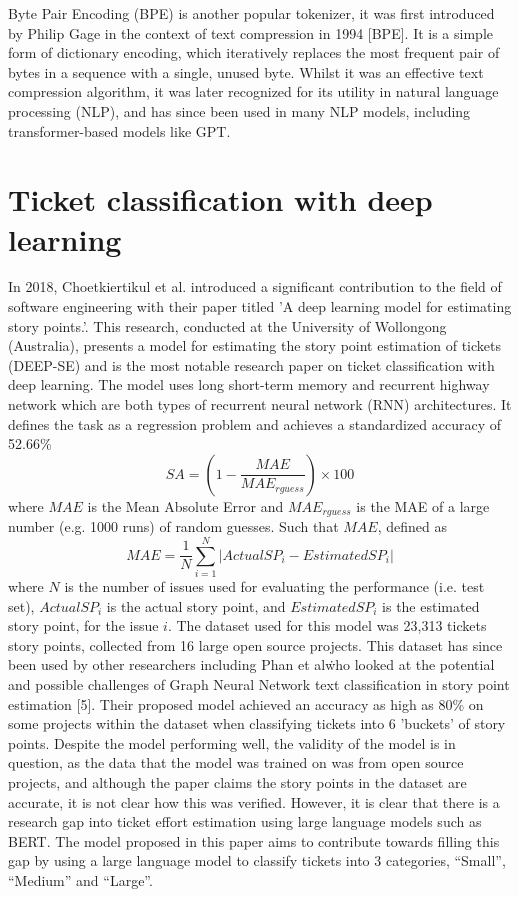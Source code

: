 \documentclass{UoYCSproject}
\begin{document}
    Byte Pair Encoding (BPE) is another popular tokenizer, it was first introduced by Philip Gage in the context of text compression in 1994 [BPE].
    It is a simple form of dictionary encoding, which iteratively replaces the most frequent pair of bytes in a sequence with a single, unused byte.
    Whilst it was an effective text compression algorithm, it was later recognized for its utility in natural language processing (NLP),
    and has since been used in many NLP models, including transformer-based models like GPT.


    \section{Ticket classification with deep learning}
    \label{sec:estimation-with-deep-learning}

    In 2018, Choetkiertikul et al.
    introduced a significant contribution to the field of software engineering with their paper titled 'A deep learning model for estimating story points.'.
    This research, conducted at the University of Wollongong (Australia), presents a model for estimating the story point estimation of tickets (DEEP-SE) and is the most notable research paper on ticket classification with deep learning.
    The model uses long short-term memory and recurrent highway network which are both types of recurrent neural network (RNN) architectures.
    It defines the task as a regression problem and achieves a standardized accuracy of 52.66\%
    \[SA = (1-\frac{MAE}{MAE_{rguess}}) \times 100\]
    where $MAE$ is the Mean Absolute Error and $MAE_{rguess}$ is the MAE of a large number (e.g. 1000 runs) of random guesses. Such that $MAE$, defined as \[ MAE = \frac{1}{N}\sum_{i=1}^{N}|ActualSP_{i} - EstimatedSP_{i}|\] where $N$ is the number of issues used for evaluating the performance (i.e. test set), $ActualSP_i$ is the actual story point, and $EstimatedSP_i$ is the estimated story point, for the issue $i$.
    The dataset used for this model was 23,313 tickets story points, collected from 16 large open source projects.
    This dataset has since been used by other researchers including Phan et al\. who looked at the potential and possible challenges of Graph Neural Network text
    classification in story point estimation [5].
    Their proposed model achieved an accuracy as high as 80\% on some projects within the dataset when classifying tickets into 6 'buckets' of story points.
    Despite the model performing well, the validity of the model is in question, as the data that the model was trained on was from open source projects, and although the paper claims the story points in the dataset are accurate, it is not clear how this was verified.
    However, it is clear that there is a research gap into ticket effort estimation using large language models such as BERT.
    The model proposed in this paper aims to contribute towards filling this gap by using a large language model to classify tickets into 3 categories, “Small”, “Medium” and “Large”.
\end{document}

